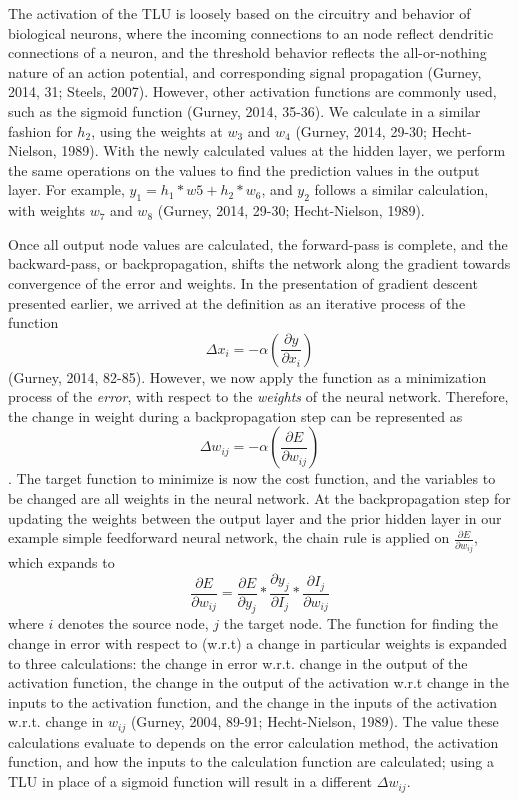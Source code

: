 \documentclass[11pt]{article}
\begin{document}
The activation of the TLU is loosely based on the circuitry and behavior of biological neurons, where the incoming connections to an node reflect dendritic connections of a neuron, and the threshold behavior reflects the all-or-nothing nature of an action potential, and corresponding signal propagation (Gurney, 2014, 31; Steels, 2007). However, other activation functions are commonly used, such as the sigmoid function (Gurney, 2014, 35-36). We calculate in a similar fashion for $h_2$, using the weights at $w_3$ and $w_4$ (Gurney, 2014, 29-30; Hecht-Nielson, 1989). With the newly calculated values at the hidden layer, we perform the same operations on the values to find the prediction values in the output layer. For example, $y_1 = h_1*w5 + h_2*w_6$, and $y_2$ follows a similar calculation, with weights $w_7$ and $w_8$ (Gurney, 2014, 29-30; Hecht-Nielson, 1989). \par
Once all output node values are calculated, the forward-pass is complete, and the backward-pass, or backpropagation, shifts the network along the gradient towards convergence of the error and weights. In the presentation of gradient descent presented earlier, we arrived at the definition as an iterative process of the function $$\Delta x_i = -\alpha(\frac{\partial y}{\partial x_i})$$ (Gurney, 2014, 82-85). However, we now apply the function as a minimization process of the \textit{error}, with respect to the \textit{weights} of the neural network. Therefore, the change in weight during a backpropagation step can be represented as $$\Delta w_{ij}= -\alpha(\frac{\partial E}{\partial w_{ij}})$$. The target function to minimize is now the cost function, and the variables to be changed are all weights in the neural network. At the backpropagation step for updating the weights between the output layer and the prior hidden layer in our example simple feedforward neural network, the chain rule is applied on $\frac{\partial E}{\partial w_{ij}} $, which expands to $$\frac{\partial E}{\partial w_{ij}} = \frac{\partial E}{\partial y_j} * \frac{\partial y_j}{\partial I_{j}} * \frac{\partial I_{j}}{\partial w_{ij}}$$ where $i$ denotes the source node, $j$ the target node. The function for finding the change in error with respect to (w.r.t) a change in particular weights is expanded to three calculations: the change in error w.r.t. change in the output of the activation function, the change in the output of the activation w.r.t change in the inputs to the activation function, and the change in the inputs of the activation w.r.t. change in $w_{ij}$ (Gurney, 2004, 89-91; Hecht-Nielson, 1989). The value these calculations evaluate to depends on the error calculation method, the activation function, and how the inputs to the calculation function are calculated; using a TLU in place of a sigmoid function will result in a different $\Delta w_{ij}$.\par
\end{document}
